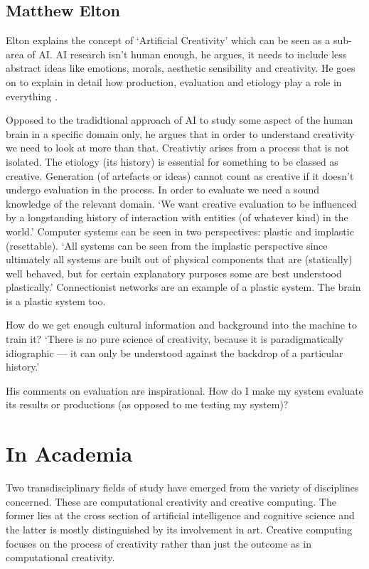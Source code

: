 \subsection*{Matthew Elton}

Elton explains the concept of `Artificial Creativity' which can be seen as a sub-area of \ac{AI}. \ac{AI} research isn't human enough, he argues, it needs to include less abstract ideas like emotions, morals, aesthetic sensibility and creativity. He goes on to explain in detail how production, evaluation and etiology play a role in everything \autocite{Elton1995}.

Opposed to the tradidtional approach of \ac{AI} to study  some aspect of the human brain in a specific domain only, he argues that in order to understand creativity we need to look at more than that. Creativtiy arises from a process that is not isolated. The etiology (its history) is essential for something to be classed as creative. Generation (of artefacts or ideas) cannot count as creative if it doesn't undergo evaluation in the process. In order to evaluate we need a sound knowledge of the relevant domain. `We want creative evaluation to be influenced by a longstanding history of interaction with entities (of whatever kind) in the world.' Computer systems can be seen in two perspectives: plastic and implastic (resettable). `All systems can be seen from the implastic perspective since ultimately all systems are built out of physical components that are (statically) well behaved, but for certain explanatory purposes some are best understood plastically.' Connectionist networks are an example of a plastic system. The brain is a plastic system too.

How do we get enough cultural information and background into the machine to train it? `There is no pure science of creativity, because it is paradigmatically idiographic --- it can only be understood against the backdrop of a particular history.'

His comments on evaluation are inspirational. How do I make my system evaluate its results or productions (as opposed to me testing my system)?


\section{In Academia}

Two transdisciplinary fields of study have emerged from the variety of disciplines concerned. These are computational creativity and creative computing. The former lies at the cross section of artificial intelligence and cognitive science and the latter is mostly distinguished by its involvement in art. Creative computing focuses on the process of creativity rather than just the outcome as in computational creativity.

